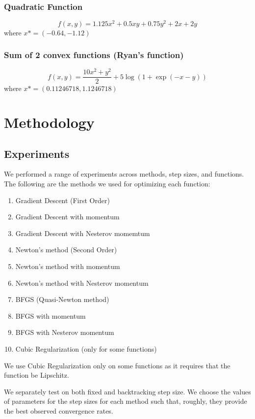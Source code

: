 \documentclass{article}
\begin{document}
\subsubsection{Quadratic Function}
\begin{equation}
f(x,y) = 1.125x^2 + 0.5xy + 0.75y^2 + 2x + 2y
\end{equation}
where $x* = (-0.64,-1.12)$

\subsubsection{Sum of 2 convex functions (Ryan's function)}
\begin{equation}
f(x,y) = \frac{10x^2 + y^2}{2} + 5\log(1+\exp(-x-y))
\end{equation}
where $x* = (0.11246718,1.1246718)$



\section{Methodology}\label{experiments}

\subsection{Experiments}
We performed a range of experiments across methods, step sizes, and functions. The following are the methods we used for optimizing each function:
\begin{enumerate}
	\item Gradient Descent (First Order)
	\item Gradient Descent with momentum
	\item Gradient Descent with Nesterov momemtum
	\item Newton's method (Second Order)
	\item Newton's method with momentum 
	\item Newton's method with Nesterov momentum
	\item BFGS (Quasi-Newton method)
	\item BFGS with momentum
	\item BFGS with Nesterov momentum
	\item Cubic Regularization (only for some functions)
\end{enumerate}

We use Cubic Regularization only on some functions as it requires that the function be Lipschitz.

We separately test on both fixed and backtracking step size. We choose the values of parameters for the step sizes for each method such that, roughly, they provide the best observed convergence rates.
\end{document}
